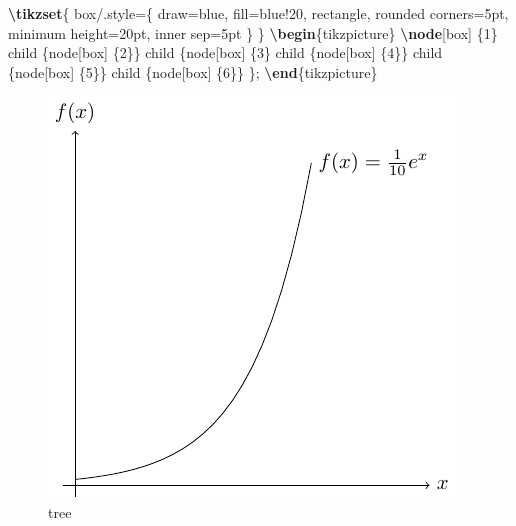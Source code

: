 \documentclass[
]{book}
\newenvironment{Shaded}{\begin{snugshade}}{\end{snugshade}}
\newcommand{\ExtensionTok}[1]{#1}
\newcommand{\FunctionTok}[1]{\textcolor[rgb]{0.13,0.29,0.53}{\textbf{#1}}}
\newcommand{\KeywordTok}[1]{\textcolor[rgb]{0.13,0.29,0.53}{\textbf{#1}}}
\newcommand{\NormalTok}[1]{#1}
\newcommand{\SpecialCharTok}[1]{\textcolor[rgb]{0.81,0.36,0.00}{\textbf{#1}}}
\newcommand{\SpecialStringTok}[1]{\textcolor[rgb]{0.31,0.60,0.02}{#1}}
\theoremstyle{definition}
\theoremstyle{definition}
\theoremstyle{definition}
\theoremstyle{definition}
\theoremstyle{remark}
\begin{document}
\begin{Shaded}
\begin{Highlighting}[]
\FunctionTok{\textbackslash{}tikzset}\NormalTok{\{}
\NormalTok{  box/.style=\{}
\NormalTok{    draw=blue,}
\NormalTok{    fill=blue!20,}
\NormalTok{    rectangle,}
\NormalTok{    rounded corners=5pt,}
\NormalTok{    minimum height=20pt,}
\NormalTok{    inner sep=5pt}
\NormalTok{  \}}
\NormalTok{\}}
\KeywordTok{\textbackslash{}begin}\NormalTok{\{}\ExtensionTok{tikzpicture}\NormalTok{\}}
  \FunctionTok{\textbackslash{}node}\NormalTok{[box] \{1\}}
\NormalTok{      child \{node[box] \{2\}\}}
\NormalTok{      child \{node[box] \{3\}}
\NormalTok{          child \{node[box] \{4\}\}}
\NormalTok{          child \{node[box] \{5\}\}}
\NormalTok{          child \{node[box] \{6\}\}}
\NormalTok{      \};}
\KeywordTok{\textbackslash{}end}\NormalTok{\{}\ExtensionTok{tikzpicture}\NormalTok{\}}
\end{Highlighting}
\end{Shaded}

\begin{figure}
\includegraphics[width=0.75\linewidth]{202401311000-TikZ_files/figure-latex/unnamed-chunk-59-1} \caption{tree}\label{fig:unnamed-chunk-59}
\end{figure}

\begin{Shaded}
\end{Shaded}
\end{document}
